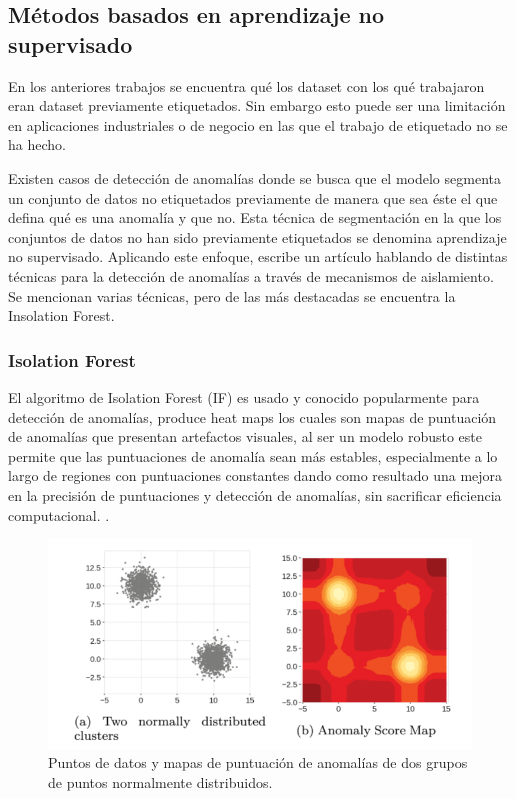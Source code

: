 \documentclass[11pt,a4paper,spanish]{book}
\numberwithin{equation}{chapter}
\numberwithin{figure}{chapter}
\begin{document}
\subsection{Métodos basados en aprendizaje no supervisado}

En los anteriores trabajos se encuentra qué los dataset con los qué trabajaron eran dataset previamente etiquetados. Sin embargo esto puede ser una limitación en aplicaciones industriales o de negocio en las que el trabajo de etiquetado no se ha hecho.


Existen casos de detección de anomalías donde se busca que el modelo segmenta un conjunto de datos no etiquetados previamente de manera que sea éste el que defina qué es una anomalía y que no. Esta técnica de segmentación en la que los conjuntos de datos no han sido previamente etiquetados se denomina aprendizaje no supervisado. Aplicando este enfoque,  \cite{Cao_2025} escribe un artículo hablando de distintas técnicas para la detección de anomalías a través de mecanismos de aislamiento. Se mencionan varias técnicas, pero de las más destacadas se encuentra la Insolation Forest.


\subsubsection{Isolation Forest}

El algoritmo de Isolation Forest (IF) es usado y conocido popularmente para detección de anomalías, produce heat maps los cuales son mapas de puntuación de anomalías que presentan artefactos visuales, al ser un modelo robusto este permite que las puntuaciones de anomalía sean más estables, especialmente a lo largo de regiones con puntuaciones constantes dando como resultado una mejora en la precisión de puntuaciones y detección de anomalías, sin sacrificar eficiencia computacional. \cite{liu2021isoletionforest}.

\begin{figure}[h]
    \centering
    \includegraphics[width=1.0\textwidth]{media/liu-isolation-forest.png}
    \caption{Puntos de datos y mapas de puntuación de anomalías de dos grupos de puntos normalmente distribuidos.  \protect\cite{liu2021isoletionforest} }
    \label{fig:figIsolationForest}
\end{figure}
\end{document}
